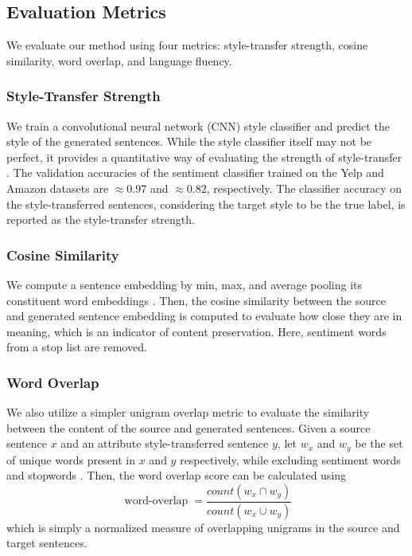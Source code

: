 \documentclass[letterpaper]{article} %
\begin{document}
\subsection{Evaluation Metrics}

We evaluate our method using four metrics: style-transfer strength, cosine similarity, word overlap, and language fluency.

\subsubsection{Style-Transfer Strength}
We train a convolutional neural network (CNN) style classifier \cite{kim2014convolutional} and predict the style of the generated sentences.
While the style classifier itself may not be perfect, it provides a quantitative way of evaluating the strength of style-transfer \cite{hu2017toward,shen2017style,fu2017style}.
The validation accuracies of the sentiment classifier trained on the Yelp and Amazon datasets are $\approx 0.97$ and $\approx 0.82$, respectively.
The classifier accuracy on the style-transferred sentences, considering the target style to be the true label, is reported as the style-transfer strength.

\subsubsection{Cosine Similarity}
We compute a sentence embedding by min, max, and average pooling its constituent word embeddings \cite{fu2017style}.
Then, the cosine similarity between the source and generated sentence embedding is computed to evaluate how close they are in meaning, which is an indicator of content preservation.
Here, sentiment words from a stop list \cite{hu2004mining} are removed.

\subsubsection{Word Overlap}
We also utilize a simpler unigram overlap metric to evaluate the similarity between the content of the source and generated sentences.
Given a source sentence $x$ and an attribute style-transferred sentence $y$, let $w_x$ and $w_y$ be the set of unique words present in $x$ and $y$ respectively, while excluding sentiment words \cite{hu2004mining} and stopwords \cite{bird2004nltk}.
Then, the word overlap score can be calculated using $$\operatorname{word-overlap} = \frac{count(w_x \cap w_y)}{count(w_x \cup w_y)}$$ which is simply a normalized measure of overlapping unigrams in the source and target sentences.
\end{document}
